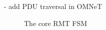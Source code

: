             - add PDU traversal in OMNeT

            \begin{figure}[H]
                \begin{center}
                  \caption{The core RMT FSM}
                  \label{rmt-fsm}
                \end{center}
            \end{figure}

